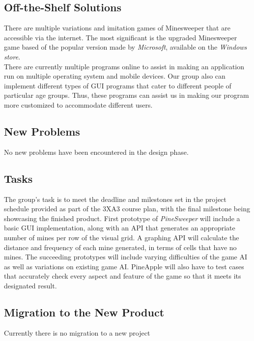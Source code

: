 \documentclass[12pt, titlepage]{article}
\begin{document}
\subsection{Off-the-Shelf Solutions}

There are multiple variations and imitation games of Minesweeper that are accessible via the internet. The most significant is the upgraded Minesweeper game based of the popular version made by \textit{Microsoft}, available on the \textit{Windows store}. \\

There are currently multiple programs online to assist in making an application run on multiple operating system and mobile devices.
Our group also can implement different types of GUI programs that cater to different people of particular age groups. Thus, these
programs can assist us in making our program more customized to accommodate different users.

\subsection{New Problems}

No new problems have been encountered in the design phase.

\subsection{Tasks}

The group's task is to meet the deadline and milestones set in the project schedule provided as part of the 3XA3 course plan, with the
final milestone being showcasing the finished product. First prototype of \textit{PineSweeper} will include a basic GUI implementation,
along with an API that generates an appropriate number of mines per row of the visual grid. A graphing API will calculate the distance
and frequency of each mine generated, in terms of cells that have no mines. The succeeding prototypes will include varying difficulties
of the game AI as well as variations on existing game AI. PineApple will also have to test cases that accurately check every aspect and
feature of the game so that it meets its designated result.

\subsection{Migration to the New Product}

Currently there is no migration to a new project
\end{document}
